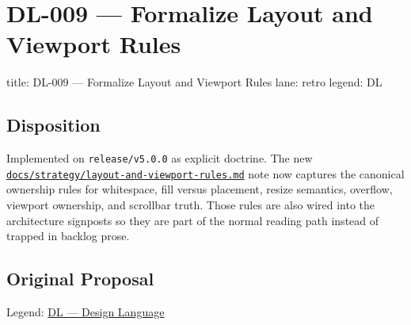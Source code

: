 \chapter{DL-009 --- Formalize Layout and Viewport Rules}\label{record-297}

\smallskip

\begin{RecordMeta}
title: DL-009 — Formalize Layout and Viewport Rules
lane: retro
legend: DL

\end{RecordMeta}

\section{Disposition}\label{record-297-disposition}

Implemented on \texttt{r\allowbreak{}e\allowbreak{}l\allowbreak{}e\allowbreak{}a\allowbreak{}s\allowbreak{}e\allowbreak{}/\allowbreak{}v\allowbreak{}5\allowbreak{}.\allowbreak{}0\allowbreak{}.\allowbreak{}0} as explicit doctrine. The new \href{https://github.com/flyingrobots/bijou/blob/cbd70612140e7a450d764b3c7be1c6af878b99bc/docs/method/strategy/layout-and-viewport-rules.md}{\texttt{d\allowbreak{}o\allowbreak{}c\allowbreak{}s\allowbreak{}/\allowbreak{}s\allowbreak{}t\allowbreak{}r\allowbreak{}a\allowbreak{}t\allowbreak{}e\allowbreak{}g\allowbreak{}y\allowbreak{}/\allowbreak{}l\allowbreak{}a\allowbreak{}y\allowbreak{}o\allowbreak{}u\allowbreak{}t\allowbreak{}-\allowbreak{}a\allowbreak{}n\allowbreak{}d\allowbreak{}-\allowbreak{}v\allowbreak{}i\allowbreak{}e\allowbreak{}w\allowbreak{}p\allowbreak{}o\allowbreak{}r\allowbreak{}t\allowbreak{}-\allowbreak{}r\allowbreak{}u\allowbreak{}l\allowbreak{}e\allowbreak{}s\allowbreak{}.\allowbreak{}m\allowbreak{}d}} note now captures the canonical ownership rules for whitespace, fill versus placement, resize semantics, overflow, viewport ownership, and scrollbar truth. Those rules are also wired into the architecture signposts so they are part of the normal reading path instead of trapped in backlog prose.

\section{Original Proposal}\label{record-297-original-proposal}

Legend: \href{https://github.com/flyingrobots/bijou/blob/1853ad902f6bf219326409e7f743a5a1d6517dbc/docs/method/legends/DL-design-language.md}{DL --- Design Language}

